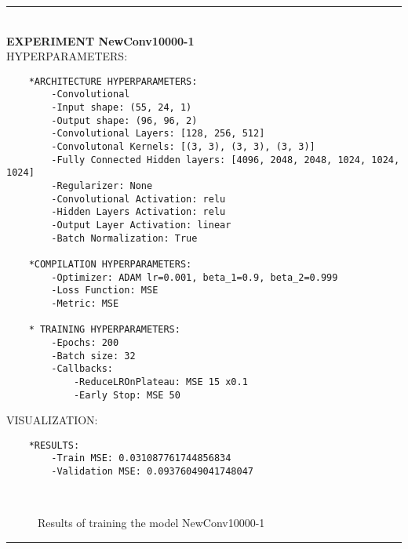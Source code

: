 \rule{0.5\textwidth}{0.5pt}\\

	{\large \textbf{EXPERIMENT NewConv10000-1}}\\
	
	{\normalsize HYPERPARAMETERS:}
	\begin{lstlisting}	
	*ARCHITECTURE HYPERPARAMETERS:
		-Convolutional
		-Input shape: (55, 24, 1)
		-Output shape: (96, 96, 2)
		-Convolutional Layers: [128, 256, 512]
		-Convolutonal Kernels: [(3, 3), (3, 3), (3, 3)]
		-Fully Connected Hidden layers: [4096, 2048, 2048, 1024, 1024, 1024]
		-Regularizer: None
		-Convolutional Activation: relu
		-Hidden Layers Activation: relu
		-Output Layer Activation: linear
		-Batch Normalization: True
	
	*COMPILATION HYPERPARAMETERS:
		-Optimizer: ADAM lr=0.001, beta_1=0.9, beta_2=0.999
		-Loss Function: MSE
		-Metric: MSE
	
	* TRAINING HYPERPARAMETERS:
		-Epochs: 200
		-Batch size: 32
		-Callbacks:
			-ReduceLROnPlateau: MSE 15 x0.1
			-Early Stop: MSE 50
	\end{lstlisting}
		
	{\normalsize VISUALIZATION:}
	\begin{lstlisting}
	*RESULTS:
        -Train MSE: 0.031087761744856834
        -Validation MSE: 0.09376049041748047
	\end{lstlisting}
	
	\begin{figure*}[ht!]
		\hspace{\fill}
		\hspace{\fill}
		\\
		\caption{Results of training the model NewConv10000-1}
	\end{figure*}
	
\FloatBarrier	
\rule{0.5\textwidth}{0.5pt}\\	